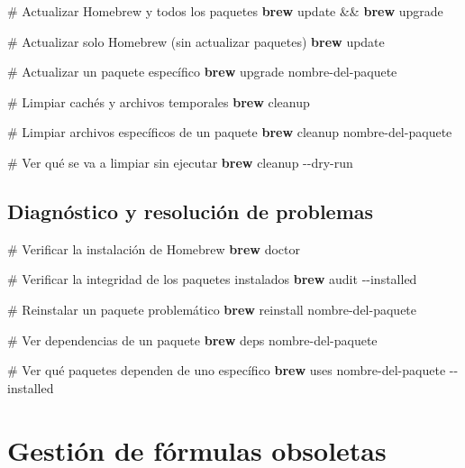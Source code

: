 \documentclass[
  11pt,
  letterpaper,
  oneside,
  openany]{scrbook}
\newenvironment{Shaded}{}{}
\newcommand{\AttributeTok}[1]{\textcolor[rgb]{0.84,0.23,0.29}{#1}}
\newcommand{\CommentTok}[1]{\textcolor[rgb]{0.42,0.45,0.49}{#1}}
\newcommand{\ExtensionTok}[1]{\textcolor[rgb]{0.84,0.23,0.29}{\textbf{#1}}}
\newcommand{\KeywordTok}[1]{\textcolor[rgb]{0.84,0.23,0.29}{#1}}
\newcommand{\NormalTok}[1]{\textcolor[rgb]{0.14,0.16,0.18}{#1}}
\begin{document}
\begin{Shaded}
\begin{Highlighting}[]
\CommentTok{\# Actualizar Homebrew y todos los paquetes}
\ExtensionTok{brew}\NormalTok{ update }\KeywordTok{\&\&} \ExtensionTok{brew}\NormalTok{ upgrade}

\CommentTok{\# Actualizar solo Homebrew (sin actualizar paquetes)}
\ExtensionTok{brew}\NormalTok{ update}

\CommentTok{\# Actualizar un paquete específico}
\ExtensionTok{brew}\NormalTok{ upgrade nombre{-}del{-}paquete}

\CommentTok{\# Limpiar cachés y archivos temporales}
\ExtensionTok{brew}\NormalTok{ cleanup}

\CommentTok{\# Limpiar archivos específicos de un paquete}
\ExtensionTok{brew}\NormalTok{ cleanup nombre{-}del{-}paquete}

\CommentTok{\# Ver qué se va a limpiar sin ejecutar}
\ExtensionTok{brew}\NormalTok{ cleanup }\AttributeTok{{-}{-}dry{-}run}
\end{Highlighting}
\end{Shaded}

\subsection{Diagnóstico y resolución de
problemas}\label{diagnuxf3stico-y-resoluciuxf3n-de-problemas}

\begin{Shaded}
\begin{Highlighting}[]
\CommentTok{\# Verificar la instalación de Homebrew}
\ExtensionTok{brew}\NormalTok{ doctor}

\CommentTok{\# Verificar la integridad de los paquetes instalados}
\ExtensionTok{brew}\NormalTok{ audit }\AttributeTok{{-}{-}installed}

\CommentTok{\# Reinstalar un paquete problemático}
\ExtensionTok{brew}\NormalTok{ reinstall nombre{-}del{-}paquete}

\CommentTok{\# Ver dependencias de un paquete}
\ExtensionTok{brew}\NormalTok{ deps nombre{-}del{-}paquete}

\CommentTok{\# Ver qué paquetes dependen de uno específico}
\ExtensionTok{brew}\NormalTok{ uses nombre{-}del{-}paquete }\AttributeTok{{-}{-}installed}
\end{Highlighting}
\end{Shaded}

\section{Gestión de fórmulas
obsoletas}\label{gestiuxf3n-de-fuxf3rmulas-obsoletas}
\end{document}
